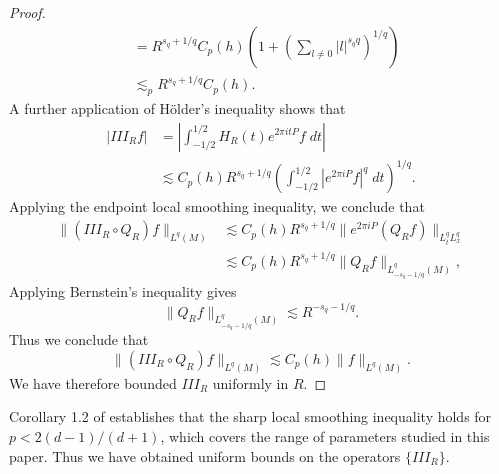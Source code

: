 \begin{proof}
\begin{align*}
        &= R^{s_q + 1/q} C_p(h) \left( 1 + \left( \sum_{l \neq 0} |l|^{s_q q} \right)^{1/q} \right) \\
        &\lesssim_p R^{s_q + 1/q} C_p(h).
    \end{align*}
    A further application of H\"{o}lder's inequality shows that
    \begin{align*}
        | III_R f | &= \left| \int_{-1/2}^{1/2} H_R(t) e^{2 \pi i t P} f\; dt \right|\\
        &\lesssim C_p(h) R^{s_q + 1/q} \left( \int_{-1/2}^{1/2} |e^{2 \pi i P} f|^{q}\; dt \right)^{1/q}.
    \end{align*}
    Applying the endpoint local smoothing inequality, we conclude that
    \begin{align*}
        \| (III_R \circ Q_R)f \|_{L^{q}(M)} &\lesssim C_p(h) R^{s_q + 1/q} \| e^{2 \pi i P} (Q_R f) \|_{L^{q}_t L^{q}_x}\\
        &\lesssim C_p(h) R^{s_q + 1/q} \| Q_R f \|_{L^{q}_{-s_q - 1/q}(M)},
    \end{align*}
    Applying Bernstein's inequality gives
    \[ \| Q_R f \|_{L^{q}_{-s_q - 1/q}(M)} \lesssim R^{-s_q - 1/q}. \]
    Thus we conclude that
    \[ \| (III_R \circ Q_R) f \|_{L^{q}(M)} \lesssim C_p(h) \| f \|_{L^{q}(M)}. \]
    We have therefore bounded $III_R$ uniformly in $R$.
\end{proof}

Corollary 1.2 of \cite{LeeSeeger} establishes that the sharp local smoothing inequality holds for $p < 2(d-1)/(d+1)$, which covers the range of parameters studied in this paper. Thus we have obtained uniform bounds on the operators $\{ III_R \}$.

